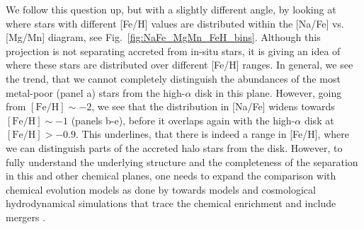 \documentclass[fleqn,usenatbib]{mnras}
\begin{document}
We follow this question up, but with a slightly different angle, by looking at where stars with different [Fe/H] values are distributed within the [Na/Fe] vs. [Mg/Mn] diagram, see Fig.~\ref{fig:NaFe_MgMn_FeH_bins}. Although this projection is not separating accreted from in-situ stars, it is giving an idea of where these stars are distributed over different [Fe/H] ranges. In general, we see the trend, that we cannot completely distinguish the abundances of the most metal-poor (panel a) stars from the high-$\alpha$ disk in this plane. However, going from $\mathrm{[Fe/H]} \sim -2$, we see that the distribution in [Na/Fe] widens towards $\mathrm{[Fe/H]} \sim -1$ (panels b-e), before it overlaps again with the high-$\alpha$ disk at $\mathrm{[Fe/H]} > - 0.9$. This underlines, that there is indeed a range in [Fe/H], where we can distinguish parts of the accreted halo stars from the disk. However, to fully understand the underlying structure and the completeness of the separation in this and other chemical planes, one needs to expand the comparison with chemical evolution models as done by \citet{Horta2021} towards models and cosmological hydrodynamical simulations that trace the chemical enrichment and include mergers \citep[see e.g.][]{Buck2020, Buck2021, Sestito2021}.
\end{document}
